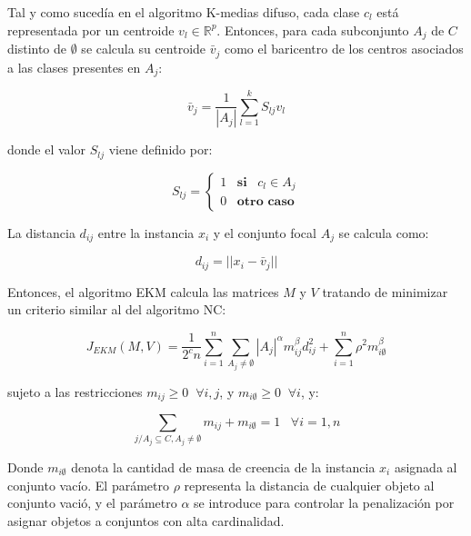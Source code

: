 Tal y como sucedía en el algoritmo K-medias difuso, cada clase $c_l$ está representada por un centroide $v_l \in \mathbb{R}^p$. Entonces, para cada subconjunto $A_j$ de $C$ distinto de $\emptyset$ se calcula su centroide $\bar{v}_j$ como el baricentro de los centros asociados a las clases presentes en $A_j$:

\begin{equation}
\bar{v}_j = \frac{1}{|A_j|} \sum_{l=1}^{k} S_{lj} v_l
\label{eqn11}
\end{equation}

donde el valor $S_{lj}$ viene definido por:

\begin{equation}
S_{lj} = \begin{cases}
1 \;\;\; \textbf{si} \;\;\; c_l \in A_j\\
0 \;\;\; \textbf{otro caso}
\end{cases}
\label{eqn12}
\end{equation}

La distancia $d_{ij}$ entre la instancia $x_i$ y el conjunto focal $A_j$ se calcula como:

\begin{equation}
d_{ij} = ||x_i - \bar{v}_j||
\label{eqn13}
\end{equation}

Entonces, el algoritmo \acs{EKM} calcula las matrices $M$ y $V$ tratando de minimizar un criterio similar al del algoritmo \acs{NC}:

\begin{equation}
J_{EKM}(M,V) = \frac{1}{2^cn} \sum_{i=1}^{n}\sum_{A_j \neq \emptyset} |A_j|^\alpha m_{ij}^\beta d_{ij}^2 + \sum_{i=1}^{n} \rho^2 m_{i\emptyset}^\beta
\label{eqn14}
\end{equation}

sujeto a las restricciones $m_{ij} \ge 0 \;\; \forall i,j$, y $m_{i\emptyset} \ge 0 \;\; \forall i$, y:

\begin{equation}
\sum_{j/A_j \subseteq C, A_j \neq \emptyset} m_{ij} + m_{i\emptyset} = 1 \;\;\; \forall i = 1,n
\label{eqn15}
\end{equation}

Donde $m_{i\emptyset}$ denota la cantidad de masa de creencia de la instancia $x_i$ asignada al conjunto vacío. El parámetro $\rho$ representa la distancia de cualquier objeto al conjunto vació, y el parámetro $\alpha$ se introduce para controlar la penalización por asignar objetos a conjuntos con alta cardinalidad.

